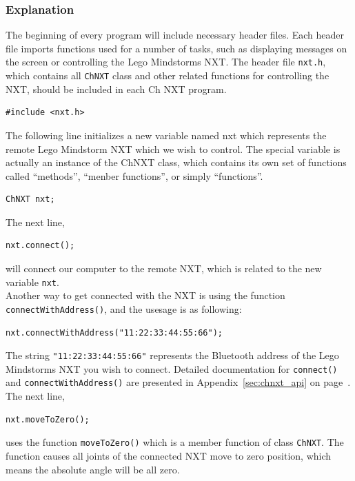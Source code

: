 \documentclass[11pt]{article}
\begin{document}
\subsubsection*{Explanation}
The beginning of every program will include necessary header files. Each header file 
imports functions used for a number of tasks, such as displaying messages on the 
screen or controlling the Lego Mindstorms NXT. The header file {\tt nxt.h}, which 
contains all {\tt ChNXT} class and other related functions for controlling the 
NXT, should be included in each Ch NXT program.
\begin{lstlisting}
#include <nxt.h>
\end{lstlisting}
The following line initializes a new variable named nxt which represents the remote 
Lego Mindstorm NXT which we wish to control. The special variable is actually an 
instance of the ChNXT class, which contains its own set of functions called ``methods'', 
``menber functions'', or simply ``functions''.
\begin{lstlisting}
ChNXT nxt;
\end{lstlisting}
The next line,
\begin{lstlisting}
nxt.connect();
\end{lstlisting}
will connect our computer to the remote NXT, which is related to the new variable 
{\tt nxt}.\\

Another way to get connected with the NXT is using the function {\tt connectWithAddress()}, 
and the usesage is as following:
\begin{lstlisting}
nxt.connectWithAddress("11:22:33:44:55:66");
\end{lstlisting}
The string {\tt "11:22:33:44:55:66"} represents the Bluetooth address of the Lego 
Mindstorms NXT you wish to connect. Detailed documentation for {\tt connect()} 
and {\tt connectWithAddress()} are presented in Appendix~\ref{sec:chnxt_api} on 
page~\pageref{sec:chnxt_api}. The next line,
\begin{lstlisting}
nxt.moveToZero();
\end{lstlisting}
uses the function {\tt moveToZero()} which is a member function of class {\tt ChNXT}. 
The function causes all joints of the connected NXT move to zero position, which 
means the absolute angle will be all zero.\\
\end{document}
